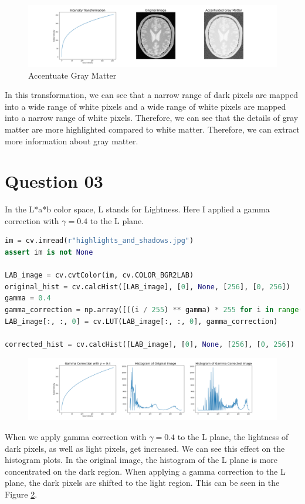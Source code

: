 \documentclass[a4paper]{article}
\begin{document}
\begin{figure}[!htb]
    \centering
    \hspace*{-2cm}
    \includegraphics[width=1.2\textwidth]{../q22.png}
    \caption{Accentuate Gray Matter}
    \label{figq22}
\end{figure}

In this transformation, we can see that a narrow range of dark pixels
 are mapped into a wide range of white pixels and a wide range of white
  pixels are mapped into a narrow range of white pixels. Therefore,
   we can see that the details of gray matter are more highlighted 
   compared to white matter. Therefore, we can extract more information about
    gray matter.

\section*{Question 03}
In the L*a*b color space, L stands for Lightness. Here I applied a gamma correction with
 $\gamma = 0.4$ to the L plane.
\begin{lstlisting}[language=python, caption={Gamma Correction with $\gamma =0.4$} ]
im = cv.imread(r"highlights_and_shadows.jpg")
assert im is not None

LAB_image = cv.cvtColor(im, cv.COLOR_BGR2LAB)
original_hist = cv.calcHist([LAB_image], [0], None, [256], [0, 256])
gamma = 0.4
gamma_correction = np.array([((i / 255) ** gamma) * 255 for i in range(0,256)],dtype=np.uint8)
LAB_image[:, :, 0] = cv.LUT(LAB_image[:, :, 0], gamma_correction)

corrected_hist = cv.calcHist([LAB_image], [0], None, [256], [0, 256])
\end{lstlisting}

\begin{figure}[!htb]
    \centering
    \hspace*{-3cm}
    \includegraphics[width=1.3\textwidth]{../q31.png}
    \caption{}
    \label{figq31}
\end{figure}
When we apply gamma
 correction with $\gamma = 0.4$ to the L plane, the lightness of dark pixels, as well
  as light pixels, get increased.  We can see this effect on the histogram plots. In the
 original image, the histogram of the L plane is more concentrated on
  the dark region. When applying a gamma correction to the L plane, the dark pixels are shifted 
to the light region. This can be seen in the Figure \ref{figq31}.
\end{document}
